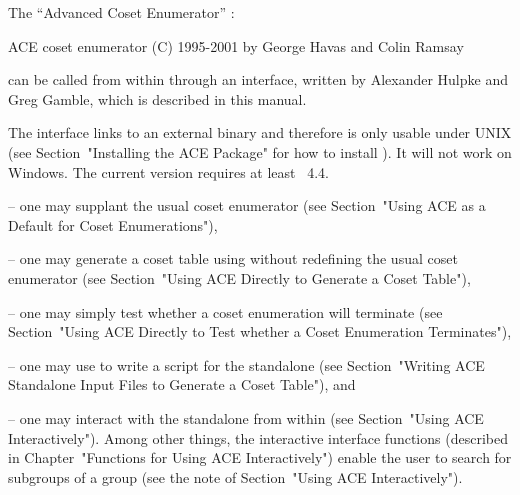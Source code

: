 

The ``Advanced Coset Enumerator'' {\ACE}:

\begintt
ACE coset enumerator (C) 1995-2001 by George Havas and Colin Ramsay
\endtt
{}

can  be called  from within  {\GAP} through  an interface,  written by
Alexander Hulpke and Greg Gamble, which is described in this manual.

The interface links to an external binary and therefore is only usable
under UNIX (see  Section~"Installing  the  ACE  Package"  for  how  to
install  {\ACE}).  It  will  not  work  on  Windows.
The current version requires at least {\GAP}~4.4.

\beginlist%

\item{--} one may supplant the  usual  {\GAP}  coset  enumerator  (see
Section~"Using ACE as a Default for Coset Enumerations"),

\item{--}  one  may  generate  a  coset  table  using  {\ACE}  without
redefining the usual {\GAP} coset enumerator (see  Section~"Using  ACE
Directly to Generate a Coset Table"),

\item{--} one  may  simply  test  whether  a  coset  enumeration  will
terminate (see Section~"Using ACE Directly to  Test  whether  a  Coset
Enumeration Terminates"),

\item{--} one may  use  {\GAP}  to  write  a  script  for  the  {\ACE}
standalone  (see  Section~"Writing  ACE  Standalone  Input  Files   to
Generate a Coset Table"), and

\item{--} one may interact with  the  {\ACE}  standalone  from  within
{\GAP} (see Section~"Using ACE Interactively").  Among  other  things,
the   interactive   {\ACE}   interface   functions    (described    in
Chapter~"Functions for Using ACE Interactively") enable  the  user  to
search for subgroups of a group (see the note  of  Section~"Using  ACE
Interactively").

